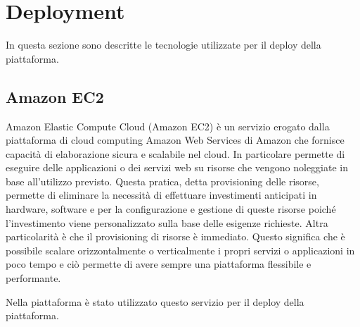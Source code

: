 \section{Deployment}
In questa sezione sono descritte le tecnologie utilizzate per il deploy della piattaforma.

\subsection{Amazon EC2}
Amazon Elastic Compute Cloud (Amazon EC2) è un servizio erogato dalla piattaforma di cloud computing Amazon Web Services di Amazon che
fornisce capacità di elaborazione sicura e scalabile nel cloud. In particolare permette di eseguire delle applicazioni
o dei servizi web su risorse che vengono noleggiate in base all'utilizzo previsto. Questa pratica, detta provisioning delle risorse,
permette di eliminare la necessità di effettuare investimenti anticipati in hardware, software e per la configurazione
e gestione di queste risorse poiché l'investimento viene personalizzato sulla base delle esigenze richieste.
Altra particolarità è che il provisioning di risorse è immediato. Questo significa che è possibile scalare orizzontalmente o verticalmente
i propri servizi o applicazioni in poco tempo e ciò permette di avere sempre una piattaforma flessibile e performante.

Nella piattaforma è stato utilizzato questo servizio per il deploy della piattaforma.

